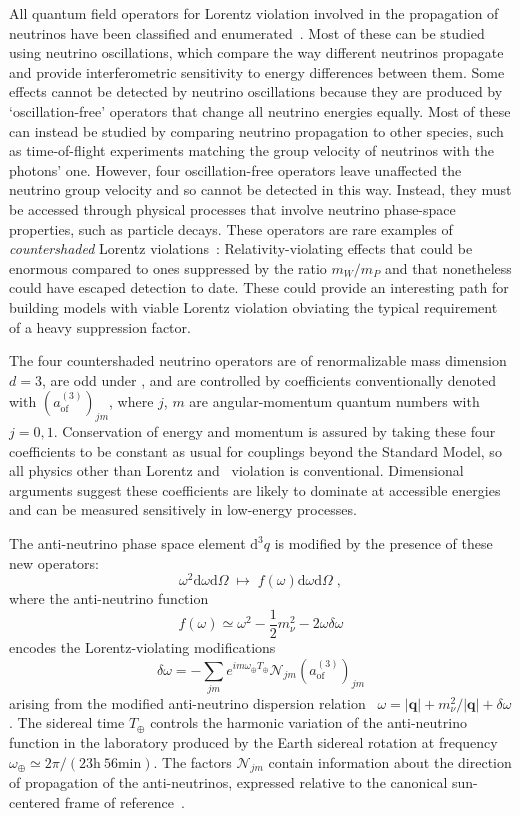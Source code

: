 All quantum field operators for Lorentz violation involved in the propagation
of neutrinos have been classified and enumerated~\cite{Kostelecky2012}. Most of
these can be studied using neutrino oscillations, which compare the way
different neutrinos propagate and provide interferometric sensitivity to energy
differences between them. Some effects cannot be detected by neutrino
oscillations because they are produced by ‘oscillation-free’ operators that
change all neutrino energies equally. Most of these can instead be studied by
comparing neutrino propagation to other species, such as time-of-flight
experiments matching the group velocity of neutrinos with the photons' one.
However, four oscillation-free operators leave unaffected the neutrino group
velocity and so cannot be detected in this way. Instead, they must be accessed
through physical processes that involve neutrino phase-space properties, such
as particle decays. These operators are rare examples of \textit{countershaded}
Lorentz violations~\cite{Kostelecky2009}: Relativity-violating effects that could
be enormous compared to ones suppressed by the ratio $m_W/m_P$ and that
nonetheless could have escaped detection to date. These could provide an
interesting path for building models with viable Lorentz violation obviating
the typical requirement of a heavy suppression factor.

The four countershaded neutrino operators are of renormalizable mass dimension
$d = 3$, are odd under \cpt, and are controlled by coefficients conventionally
denoted with $(a^{(3)}_\text{of})_{jm}$, where $j$, $m$ are angular-momentum
quantum numbers with $j = 0,1$. Conservation of energy and momentum is assured
by taking these four coefficients to be constant as usual for couplings beyond
the Standard Model, so all physics other than Lorentz and \cpt\ violation is
conventional. Dimensional arguments suggest these coefficients are likely to
dominate at accessible energies and can be measured sensitively in low-energy
processes.

The anti-neutrino phase space element $\text{d}^3q$ is modified by the presence
of these new operators:
\[
  \omega^2\text{d}\omega\text{d}\Omega \;\longmapsto\;
    f(\omega)\text{d}\omega\text{d}\Omega\;,
\]
where the anti-neutrino function
\[
  f(\omega)\simeq\omega^2-\frac{1}{2}m_\nu^2-2\omega\delta\omega
\]
encodes the Lorentz-violating modifications
\[
  \delta\omega = -\sum_{jm} e^{im\omega_\oplus T_\oplus}
    \mathcal{N}_{jm}(a_\text{of}^{(3)})_{jm}
\]
arising from the modified anti-neutrino dispersion
relation~\cite{Kostelecky2012} $\omega = |\mathbf{q}| + m_\nu^2 / |\mathbf{q}|
+ \delta\omega$. The sidereal time $T_\oplus$ controls the harmonic variation
of the anti-neutrino function in the laboratory produced by the Earth sidereal
rotation at frequency $\omega_\oplus \simeq 2\pi/(23\text{h}~56\text{min})$.
The factors $\mathcal{N}_{jm}$ contain information about the direction of
propagation of the anti-neutrinos, expressed relative to the canonical
sun-centered frame of reference~\cite{Bluhm2003, Kostelecky2002}.

